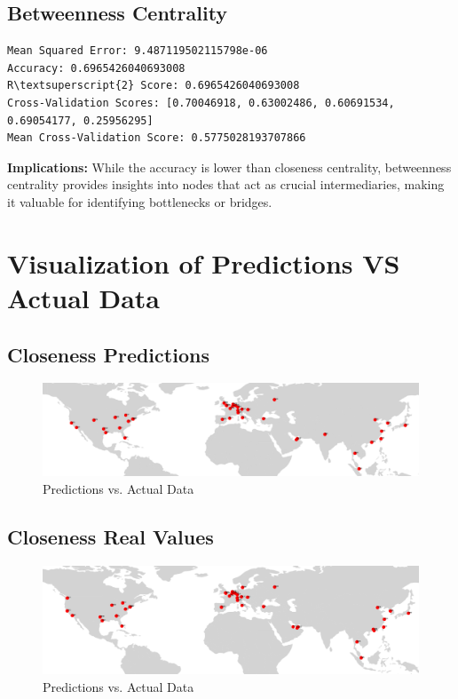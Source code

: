 \documentclass[12pt]{article}
\begin{document}
\subsection*{Betweenness Centrality}
\begin{verbatim}
Mean Squared Error: 9.487119502115798e-06
Accuracy: 0.6965426040693008
R\textsuperscript{2} Score: 0.6965426040693008
Cross-Validation Scores: [0.70046918, 0.63002486, 0.60691534, 0.69054177, 0.25956295]
Mean Cross-Validation Score: 0.5775028193707866
\end{verbatim}
\textbf{Implications:} While the accuracy is lower than closeness centrality, betweenness centrality provides insights into nodes that act as crucial intermediaries, making it valuable for identifying bottlenecks or bridges.

\section{Visualization of Predictions VS Actual Data}
\subsection*{Closeness Predictions}
\begin{figure}[h!]
	\centering
	\includegraphics[width=1\textwidth]{figures/c_pred.png}
	\caption{Predictions vs. Actual Data}
	\label{fig:closeness_predictions}
\end{figure}

\subsection*{Closeness Real Values}
\begin{figure}[h!]
	\centering
	\includegraphics[width=1\textwidth]{figures/c.png}
	\caption{Predictions vs. Actual Data}
	\label{fig:closeness}
\end{figure}
\end{document}
